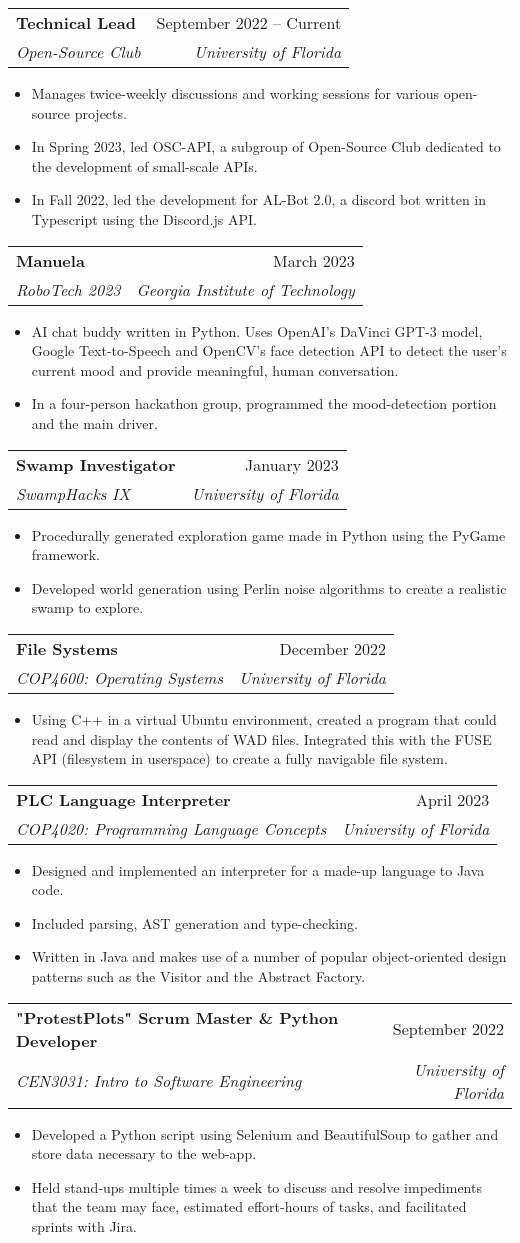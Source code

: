 \documentclass[letterpaper,11pt]{article}
\makeatletter
\newcommand{\resumeItem}[1]{
  \item\small{
    {#1 \vspace{-2pt}}
  }
}
\newcommand{\resumeSubheading}[4]{
  \vspace{-2pt}\item
    \begin{tabular*}{0.97\textwidth}[t]{l@{\extracolsep{\fill}}r}
      \textbf{#1} & #2 \\
      \textit{\small#3} & \textit{\small #4} \\
    \end{tabular*}\vspace{-7pt}
}
\newcommand{\resumeItemListStart}{\begin{itemize}}
\newcommand{\resumeItemListEnd}{\end{itemize}\vspace{-5pt}}
\makeatother
\begin{document}
    \resumeSubheading
      {Technical Lead}{September 2022 -- Current}
      {Open-Source Club}{University of Florida}
      \resumeItemListStart
        \resumeItem{Manages twice-weekly discussions and working sessions for various open-source projects.}
        \resumeItem{In Spring 2023, led OSC-API, a subgroup of Open-Source Club dedicated to the development of small-scale APIs.}
        \resumeItem{In Fall 2022, led the development for AL-Bot 2.0, a discord bot written in Typescript using the Discord.js API.}
      \resumeItemListEnd

    \resumeSubheading
      {Manuela}{March 2023}
      {RoboTech 2023}{Georgia Institute of Technology}
      \resumeItemListStart
        \resumeItem{AI chat buddy written in Python. Uses OpenAI’s DaVinci GPT-3 model, Google Text-to-Speech and OpenCV’s face detection API to detect the user’s current mood and provide meaningful, human conversation.}
        \resumeItem{In a four-person hackathon group, programmed the mood-detection portion and the main driver.}
    \resumeItemListEnd

    \resumeSubheading
      {Swamp Investigator}{January 2023}
      {SwampHacks IX}{University of Florida}
      \resumeItemListStart
        \resumeItem{Procedurally generated exploration game made in Python using the PyGame framework.}
        \resumeItem{Developed world generation using Perlin noise algorithms to create a realistic swamp to explore.}
      \resumeItemListEnd

    \resumeSubheading
      {File Systems}{December 2022}
      {COP4600: Operating Systems}{University of Florida}
      \resumeItemListStart
        \resumeItem{Using C++ in a virtual Ubuntu environment, created a program that could read and display the contents of WAD files. Integrated this with the FUSE API (filesystem in userspace) to create a fully navigable file system.}
      \resumeItemListEnd

    \resumeSubheading
      {PLC Language Interpreter}{April 2023}
      {COP4020: Programming Language Concepts}{University of Florida}
      \resumeItemListStart
        \resumeItem{Designed and implemented an interpreter for a made-up language to Java code.}
        \resumeItem{Included parsing, AST generation and type-checking.}
        \resumeItem{Written in Java and makes use of a number of popular object-oriented design patterns such as the Visitor and the Abstract Factory.}
      \resumeItemListEnd

    \resumeSubheading
      {"ProtestPlots" Scrum Master \& Python Developer}{September 2022}
      {CEN3031: Intro to Software Engineering}{University of Florida}
      \resumeItemListStart
        \resumeItem{Developed a Python script using Selenium and BeautifulSoup to gather and store data necessary to the web-app.}
        \resumeItem{Held stand-ups multiple times a week to discuss and resolve impediments that the team may face, estimated effort-hours of tasks, and facilitated sprints with Jira.}
      \resumeItemListEnd
\end{document}
